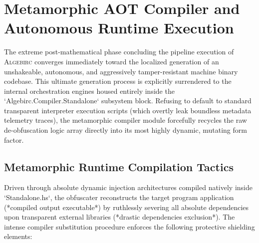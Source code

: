 \section{Metamorphic AOT Compiler and Autonomous Runtime Execution}
\label{sec:system}

The extreme post-mathematical phase concluding the pipeline execution of \textsc{Algebirc} converges immediately toward the localized generation of an unshakeable, autonomous, and aggressively tamper-resistant machine binary codebase. This ultimate generation process is explicitly surrendered to the internal orchestration engines housed entirely inside the `Algebirc.Compiler.Standalone` subsystem block. Refusing to default to standard transparent interpreter execution scripts (which overtly leak boundless metadata telemetry traces), the metamorphic compiler module forcefully recycles the raw de-obfuscation logic array directly into its most highly dynamic, mutating form factor.

\subsection{Metamorphic Runtime Compilation Tactics}
Driven through absolute dynamic injection architectures compiled natively inside `Standalone.hs`, the obfuscater reconstructs the target program application (*compiled output executable*) by ruthlessly severing all absolute dependencies upon transparent external libraries (*drastic dependencies exclusion*). The intense compiler substitution procedure enforces the following protective shielding elements:

